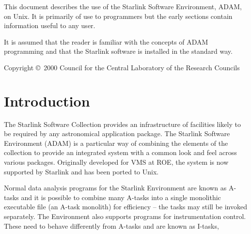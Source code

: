 \documentclass[twoside,11pt]{article}
\newcommand{\stardocinitials}  {SUN}
\newcommand{\stardoccopyright} 
{Copyright \copyright\ 2000 Council for the Central Laboratory of the Research Councils}
\newcommand{\stardocnumber}    {144.15}
\newcommand{\stardocabstract}  {
This document describes the use of the Starlink Software Environment, ADAM,
on Unix. It is primarily of use to programmers but the early sections contain
information useful to any user.
\par
It is assumed that the reader is familiar with the concepts of ADAM 
programming and that the Starlink software is installed in the standard way.}
\newcommand{\stardocname}{\stardocinitials /\stardocnumber}
\newcommand{\htmladdnormallink}[2]{#1}
\newenvironment{latexonly}{}{}
\newcommand{\xlabel}[1]{}
\renewcommand{\_}{\texttt{\symbol{95}}}
\newcommand{\ROEURL}{http://www.roe.ac.uk/}
\renewcommand{\thepage}{\roman{page}}
\begin{document}
\stardocabstract

\begin{latexonly}
\newpage
\vspace*{\fill}
\stardoccopyright
\end{latexonly}

  \newpage
  \begin{latexonly}
    \setlength{\parskip}{0mm}
    \tableofcontents
    \setlength{\parskip}{\medskipamount}
    \markboth{\stardocname}{\stardocname}
  \end{latexonly}

\cleardoublepage
\renewcommand{\thepage}{\arabic{page}}
\setcounter{page}{1}


\section{\xlabel{introduction}\label{introduction}Introduction}

The Starlink Software Collection provides an infrastructure of facilities 
likely to be required by any astronomical application package. 
The Starlink Software Environment (ADAM) is a particular way of combining the 
elements of the collection to provide an integrated system with a common look 
and feel across various packages. 
Originally developed for VMS at 
\htmladdnormallink{ROE}{\ROEURL}, 
the system is now supported by Starlink and has been ported to Unix. 

Normal data analysis programs for the Starlink Environment are known as A-tasks 
and it is possible to combine many A-tasks into a single monolithic executable
file (an A-task monolith) for efficiency -- the tasks may still be invoked 
separately.
The Environment also supports programs for instrumentation control. These need 
to behave differently from A-tasks and are known as I-tasks, 
\end{document}
